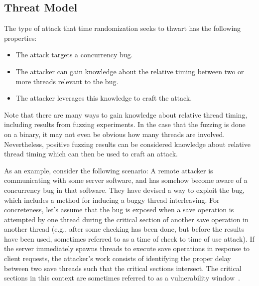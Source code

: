 \subsection{Threat Model}\label{threat-model}
The type of attack that time randomization seeks to thwart has the following properties:
\begin{itemize}\addtolength{\itemsep}{-.35\baselineskip}
	\item The attack targets a concurrency bug.
	\item The attacker can gain knowledge about the relative timing between two
  or more threads relevant to the bug.
	\item The attacker leverages this knowledge to craft the attack.
\end{itemize}
Note that there are many ways to gain knowledge about relative thread timing, including results from fuzzing experiments.
In the case that the fuzzing is done on a binary, it may not even be obvious how many threads are involved.
Nevertheless, positive fuzzing results can be considered knowledge about relative thread timing which can then be used to craft an attack.

As an example, consider the following scenario:
A remote attacker is communicating with some server software, and has somehow become aware of a concurrency bug in that software.
They have devised a way to exploit the bug, which includes a method for inducing a buggy thread interleaving.
For concreteness, let's assume that the bug is exposed when a save operation
is attempted by one thread during the critical section of another save
operation in another thread (e.g., after some checking has been done, but before the results have been used, sometimes referred to as a time of check to time of use attack).
If the server immediately spawns threads to execute save operations in response to client requests, the attacker's work consists of identifying the proper delay between two save threads such that the critical sections intersect.
The critical sections in this context are sometimes referred to as a vulnerability window~\cite{Yang2012}.

